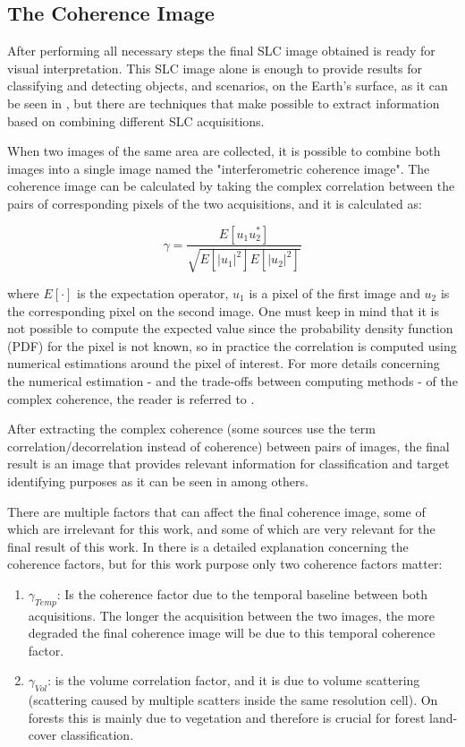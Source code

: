 \subsection{The Coherence Image}
After performing all necessary steps the final SLC image obtained is ready for visual interpretation. This SLC image alone is enough to provide results for classifying and detecting objects, and scenarios, on the Earth's surface, as it can be seen in \cite{Paolathesis,Andreathesis, 78, 79, rfsar}, but there are techniques that make possible to extract information based on combining different SLC acquisitions.

When two images of the same area are collected, it is possible to combine both images into a single image named the "interferometric coherence image". The coherence image can be calculated by taking the complex correlation between the pairs of corresponding pixels of the two acquisitions, and it is calculated as:

\begin{equation}
    \gamma = \frac{E[u_1u_2^*]}{\sqrt{E[|u_1|^2]E[|u_2|^2]}}
\end{equation}{}

where $E[\cdot]$ is the expectation operator, $u_1$ is a pixel of the first image and $u_2$ is the corresponding pixel on the second image. One must keep in mind that it is not possible to compute the expected value since the probability density function (PDF) for the pixel is not known, so in practice the correlation is computed using numerical estimations around the pixel of interest. For more details concerning the numerical estimation - and the trade-offs between computing methods - of the complex coherence, the reader is referred to \cite{Bamler}. 

After extracting the complex coherence (some sources use the term correlation/decorrelation instead of coherence) between pairs of images, the final result is an image that provides relevant information for classification and target identifying purposes as it can be seen in \cite{Alberto,Paolathesis,Martone, Martone2, Martone3, first_interferometric, Krieger,Paolo, Acqua} among others.

There are multiple factors that can affect the final coherence image, some of which are irrelevant for this work, and some of which are very relevant for the final result of this work. In \cite{Krieger,Paolathesis} there is a detailed explanation concerning the coherence factors, but for this work purpose only two coherence factors matter:
\begin{enumerate}
    \item $\gamma_{Temp}$: Is the coherence factor due to the temporal baseline between both acquisitions. The longer the acquisition between the two images, the more degraded the final coherence image will be due to this temporal coherence factor.
    \item
    $\gamma_{Vol}$: is the volume correlation factor, and it is due to volume scattering (scattering caused by multiple scatters inside the same resolution cell). On forests this is mainly due to vegetation and therefore is crucial for forest land-cover classification.
\end{enumerate} 

